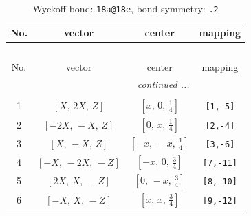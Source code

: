 \documentclass[fleqn,8pt]{jsarticle}
\begin{document}
\begin{longtable}{cccc}
\caption{Wyckoff bond: {\tt 18a@18e}, bond symmetry: {\tt .2}}
 \\
 \hline \hline
No. & vector & center & mapping \\ \hline \endfirsthead

\multicolumn{3}{l}{\tablename\ \thetable{}} \\
 \hline \hline
No. & vector & center & mapping \\ \hline \endhead

 \hline \hline
\multicolumn{3}{r}{\footnotesize\it continued ...} \\ \endfoot

 \hline \hline
\multicolumn{3}{r}{} \\ \endlastfoot

1 & $\left[ X,\, 2 X,\, Z \right]$ & $\left[ x,\, 0,\, \frac{1}{4} \right]$ & {\tt [1,-5]} \\ \hline
2 & $\left[ - 2 X,\, - X,\, Z \right]$ & $\left[ 0,\, x,\, \frac{1}{4} \right]$ & {\tt [2,-4]} \\ \hline
3 & $\left[ X,\, - X,\, Z \right]$ & $\left[ - x,\, - x,\, \frac{1}{4} \right]$ & {\tt [3,-6]} \\ \hline
4 & $\left[ - X,\, - 2 X,\, - Z \right]$ & $\left[ - x,\, 0,\, \frac{3}{4} \right]$ & {\tt [7,-11]} \\ \hline
5 & $\left[ 2 X,\, X,\, - Z \right]$ & $\left[ 0,\, - x,\, \frac{3}{4} \right]$ & {\tt [8,-10]} \\ \hline
6 & $\left[ - X,\, X,\, - Z \right]$ & $\left[ x,\, x,\, \frac{3}{4} \right]$ & {\tt [9,-12]} \\
\end{longtable}
\renewcommand{\arraystretch}{1.2}
\end{document}
